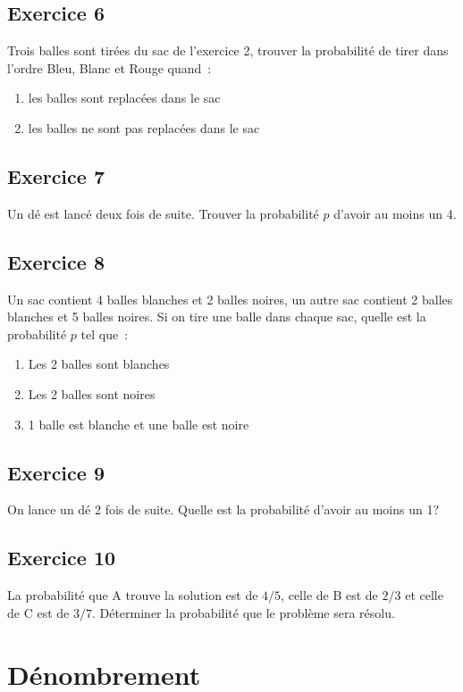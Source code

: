 \documentclass[]{book}
\theoremstyle{definition}
\begin{document}
\subsection*{Exercice 6}
Trois balles sont tir\'ees du sac de l'exercice 2, trouver la probabilit\'e de tirer dans l'ordre Bleu, Blanc et Rouge quand\ : 
\begin{enumerate}
\item les balles sont replac\'ees dans le sac
\item les balles ne sont pas replac\'ees dans le sac
\end{enumerate}

\subsection*{Exercice 7}
Un d\'e est lanc\'e deux fois de suite. Trouver la probabilit\'e $p$ d'avoir au moins un 4.

\subsection*{Exercice 8}
Un sac contient 4 balles blanches et 2 balles noires, un autre sac contient 2 balles blanches et 5 balles noires. Si on tire une balle dans chaque sac, quelle est la probabilit\'e $p$ tel que\ :
\begin{enumerate}
\item Les 2 balles sont blanches
\item Les 2 balles sont noires
\item 1 balle est blanche et une balle est noire
\end{enumerate}

\subsection*{Exercice 9}
On lance un d\'e 2 fois de suite. Quelle est la probabilit\'e d'avoir au moins un 1?

\subsection*{Exercice 10}
La probabilit\'e que A trouve la solution est de $4/5$, celle de B est de $2/3$ et celle de C est de $3/7$. D\'eterminer la probabilit\'e que le probl\`eme sera r\'esolu.



\section*{D\'enombrement}
\end{document}
